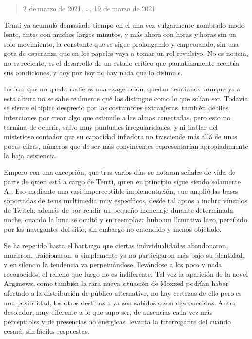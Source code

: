 \documentclass[
]{book}
\begin{document}
\begin{quote}
2 de marzo de 2021, \ldots, 19 de marzo de 2021
\end{quote}

Temti ya acumuló demasiado tiempo en el una vez vulgarmente nombrado modo lento, antes con muchos largos minutos, y más ahora con horas y horas sin un solo movimiento, la constante que se sigue prolongando y empeorando, sin una gota de esperanza que en los papeles vaya a tomar un rol revulsivo. No es noticia, no es reciente, es el desarrollo de un estado crítico que paulatinamente acentúa sus condiciones, y hoy por hoy no hay nada que lo disimule.

Indicar que no queda nadie es una exageración, quedan temtianos, aunque ya a esta altura no se sabe realmente qué los distingue como lo que solían ser. Todavía se siente el típico desprecio por las costumbres extranjeras, también débiles intenciones por crear algo que estimule a las almas conectadas, pero esto no termina de ocurrir, salvo muy puntuales irregularidades, y ni hablar del misterioso contador que su capacidad infladora no trasciende más allá de unas pocas cifras, números que de ser más convincentes representarían apropiadamente la baja asistencia.

Empero con una excepción, que tras varios días se notaran señales de vida de parte de quien está a cargo de Temti, quien en principio sigue siendo solamente A.. Eso mediante una casi imperceptible implementación, que amplió las bases soportadas de tems multimedia muy específicos, desde tal aptos a incluir vínculos de Twitch, además de por rendir un pequeño homenaje durante determinada noche, cuando la luna se ocultó y en reemplazo hubo un llamativo lazo, percibido por los navegantes del sitio, sin embargo no entendido y menos objetado.

Se ha repetido hasta el hartazgo que ciertas individualidades abandonaron, murieron, traicionaron, o simplemente ya no participaron más bajo su identidad, y en silencio la tendencia va perpetuándose, llevándose a los poco y nada reconocidos, el relleno que luego no es indiferente. Tal vez la aparición de la novel Arggnews, como también la rara nueva situación de Moxxed podrían haber afectado a la distribución de público alternativo, no hay certezas de ello pero es una posibilidad, los otros destinos o ya son sabidos o son desconocidos. Antro desolador, muy diferente a lo que supo ser, de ausencias cada vez más perceptibles y de presencias no enérgicas, levanta la interrogante del cuándo cesará, sin fáciles respuestas.
\end{document}
